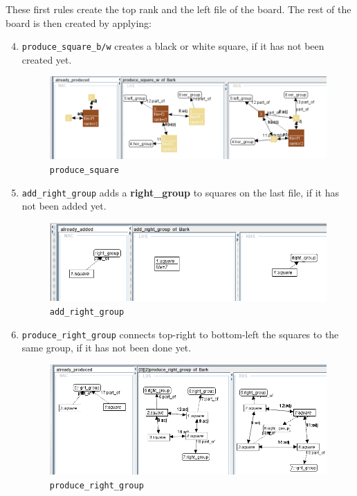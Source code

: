 \documentclass[a4paper, 10pt]{scrartcl}
\newcommand{\noderepr}[1]{\textsf{\textbf{#1}}}
\begin{document}
    These first rules create the top rank and the left file of the board. The rest of the board is then created by applying:
    \begin{enumerate}
        \setcounter{enumi}{3}
        \item \texttt{produce\_square\_b/w} creates a black or white square, if it has not been created yet.
        \begin{figure}[H]
            \centering
            \includegraphics[width=.8\linewidth]{images/produce_square.png}
            \caption{\texttt{produce\_square}}
        \end{figure}

        \item \texttt{add\_right\_group} adds a \noderepr{right\_group} to squares on the last file, if it has not been added yet.
        \begin{figure}[H]
            \centering
            \includegraphics[width=.8\linewidth]{images/add_right_group.png}
            \caption{\texttt{add\_right\_group}}
        \end{figure}

        \item \texttt{produce\_right\_group} connects top-right to bottom-left the squares to the same group, if it has not been done yet.
        \begin{figure}[H]
            \centering
            \includegraphics[width=.8\linewidth]{images/produce_right_group.png}
            \caption{\texttt{produce\_right\_group}}
        \end{figure}
    \end{enumerate}
\end{document}
